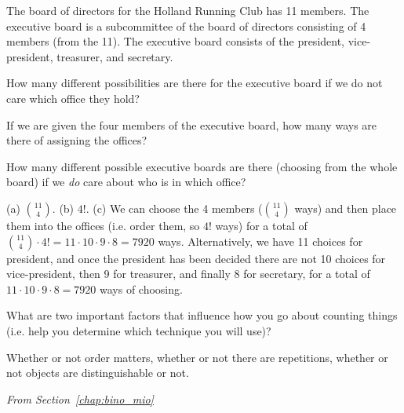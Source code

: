 \begin{requ}
The board of directors for the Holland Running Club has 11 members.
The executive board is a subcommittee of the board of directors consisting of 4 members (from the 11).
The executive board consists of the president, vice-president, treasurer, and secretary.
\begin{lenum}
\item 
How many different possibilities are there for the executive board if we do not care which office they hold?
\item 
If we are given the four members of the executive board, how many ways are there of assigning the offices?
\item
How many different possible executive boards are there (choosing from the whole board) 
if we {\em do} care about who is in which office?
\end{lenum}
\begin{requanswer}
(a) $\binom{11}{4}$.
(b) $4!$.
(c) We can choose the 4 members ($\binom{11}{4}$ ways) and then place them into the offices (i.e. order them, so $4!$ ways)
for a total of $\binom{11}{4}\cdot 4! = 11\cdot 10\cdot 9 \cdot 8 = 7920$ ways.
Alternatively, we have 11 choices for president, and once the president has been decided there are not 10 choices for
vice-president, then 9 for treasurer, and finally 8 for secretary, for a total of  $11\cdot 10\cdot 9 \cdot 8 = 7920$ ways
of choosing.
\end{requanswer}
\end{requ}

\begin{requ}
What are two important factors that influence how you go about counting things 
(i.e. help you determine which technique you will use)?
\begin{requanswer}
Whether or not order matters, whether or not there are repetitions, whether or not objects are distinguishable or not. 
\end{requanswer}
\end{requ}

\noindent
{\em From Section~\ref{chap:bino_mio}}

